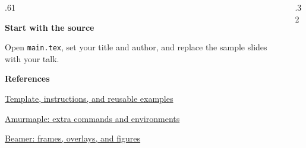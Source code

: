 \begin{frame}{}
  \begin{columns}[c,onlytextwidth]
    \begin{column}{.61\textwidth}
      {\large\bfseries\color{wvu-blue}Start with the source\par}
      \medskip
      Open \texttt{main.tex}, set your title and author, and replace the sample slides with your talk.

      \bigskip
      {\bfseries\color{wvu-blue}References\par}
      \smallskip
      \href{https://github.com/djgormley/wvu_beamer_template}{Template, instructions, and reusable examples}\par
      \smallskip
      \href{https://ctan.org/pkg/beamerthemeamurmaple}{Amurmaple: extra commands and environments}\par
      \smallskip
      \href{https://ctan.org/pkg/beamer}{Beamer: frames, overlays, and figures}
    \end{column}
    \begin{column}{.32\textwidth}
      \centering
    \end{column}
  \end{columns}
\end{frame}
